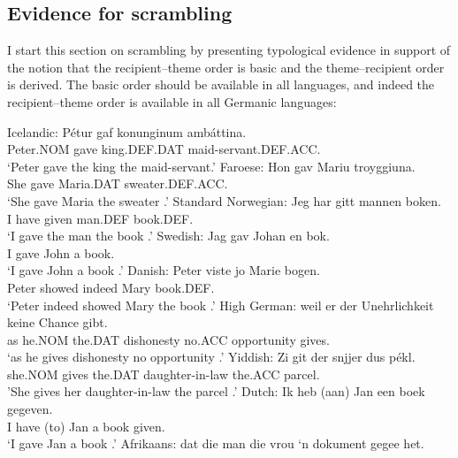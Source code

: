 	\subsection{Evidence for scrambling}
	I start this section on scrambling by presenting typological evidence in support of the notion that the recipient--theme order is basic and the theme--recipient order is derived. The basic order should be available in all languages, and indeed the recipient--theme order is available in all Germanic languages:
	\begin{exe}
\ex
\begin{xlist}
\ex Icelandic:
\gll P\'{e}tur gaf konunginum amb\'{a}ttina.\\
Peter.NOM gave king.DEF.DAT maid-servant.DEF.ACC.\\
\trans `Peter gave the king the maid-servant.'
\ex Faroese:
\gll Hon gav Mariu troyggiuna.\\
She gave Maria.DAT sweater.DEF.ACC.\\
\trans `She gave Maria the sweater \citep{Lundquist.2013b}.'
\ex Standard Norwegian:
\gll Jeg har gitt mannen boken.\\
I have given man.DEF book.DEF.\\
\trans `I gave the man the book \citep[ex 10]{Sprouse.1995}.'
\ex Swedish:
\gll Jag gav Johan en bok.\\
I gave John a book.\\
\trans `I gave John a book \citep{Holmberg.1995}.'
\ex Danish:
\gll Peter viste jo Marie bogen.\\
Peter showed indeed Mary book.DEF.\\
\trans `Peter indeed showed Mary the book \citep{Vikner.1989}.'
\ex High German:
\gll weil er der Unehrlichkeit keine Chance gibt.\\
as he.NOM the.DAT dishonesty no.ACC opportunity gives.\\
\trans `as he gives dishonesty no opportunity \citep[162]{Draye.1996}.'
\ex Yiddish:
\gll Zi git der snjjer dus pékl. \\
she.NOM gives the.DAT daughter-in-law the.ACC parcel.\\
\trans 'She gives her daughter-in-law the parcel \citep[ex 190a]{Birnbaum.1979}.'
\ex Dutch:
\gll Ik heb (aan) Jan een boek gegeven.\\
I have (to) Jan a book given.\\
\trans `I gave Jan a book \citep{Tiersma.1985}.'
\ex Afrikaans:
\gll dat die man die vrou `n dokument gegee het.\\

\end{xlist}
\end{exe}

